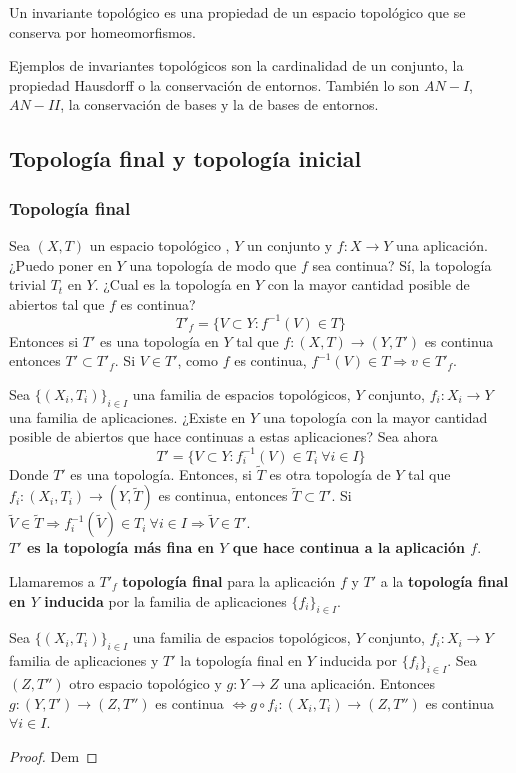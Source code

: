 \begin{ndef}
  Un invariante topológico es  una propiedad de un espacio topológico que se conserva por homeomorfismos.
\end{ndef}
\begin{exmp}
Ejemplos de invariantes topológicos son la cardinalidad de un conjunto, la propiedad Hausdorff o la conservación de entornos. También lo son $AN-I$, $AN-II$, la conservación de bases y la de bases de entornos.
\end{exmp}

\subsection{Topología final y topología inicial}
\subsubsection{Topología final}
Sea $(X,T)$ un espacio topológico , $Y$ un conjunto y $f: X \to Y$ una aplicación. ¿Puedo poner en $Y$ una topología de modo que $f$ sea continua? Sí, la topología trivial $T_t$ en $Y$. ¿Cual es la topología en $Y$ con la mayor cantidad posible de abiertos tal que $f$ es continua?
\[T'_f = \{V \subset Y: f^{-1}(V) \in T\}\]
Entonces si $T'$ es una topología en $Y$ tal que $f: (X,T) \to (Y,T')$ es continua entonces $T' \subset T'_f$. Si $V \in T'$, como $f$ es continua, $f^{-1}(V) \in T \Rightarrow v \in T'_f$.

Sea $\{(X_i,T_i)\}_{i \in I}$ una familia de espacios topológicos, $Y$ conjunto, $f_i: X_i \to Y$ una familia de aplicaciones. ¿Existe en $Y$ una topología con la mayor cantidad posible de abiertos que hace continuas a estas aplicaciones? Sea ahora
\[T' = \{V \subset Y: f_i^{-1}(V) \in T_i \ \forall i \in I\}\]
Donde $T'$ es una topología. Entonces, si $\tilde{T}$ es otra topología de $Y$ tal que $f_i: (X_i,T_i) \to (Y,\tilde{T})$ es continua, entonces $\tilde{T} \subset T'$. Si $\tilde{V} \in \tilde{T} \Rightarrow f^{-1}_i(\tilde{V}) \in T_i \ \forall i \in I \Rightarrow \tilde{V} \in T'$. \\

\textbf{$T'$ es la topología más fina en $Y$ que hace continua a la aplicación $f$}.

\begin{ndef}
  Llamaremos a $T'_f$ \textbf{topología final} para la aplicación $f$ y $T'$ a la \textbf{topología final en $Y$ inducida} por la familia de aplicaciones $\{f_i\}_{i \in I}$.
\end{ndef}
\begin{properties}
    Sea $\{(X_i,T_i)\}_{i \in I}$ una familia de espacios topológicos, $Y$ conjunto, $f_i: X_i \to Y$ familia de aplicaciones y $T'$ la topología final en $Y$ inducida por $\{f_i\}_{i \in I}$. Sea $(Z,T'')$ otro espacio topológico y $g: Y \to Z$ una aplicación. Entonces $g:(Y,T') \to (Z,T'')$ es continua $\Leftrightarrow g \circ f_i: (X_i,T_i) \to (Z,T'')$ es continua $\forall i \in I$.
\end{properties}
\begin{proof}
    Dem
\end{proof}

